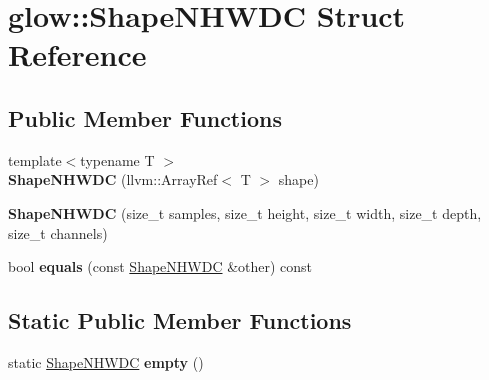 \hypertarget{structglow_1_1_shape_n_h_w_d_c}{}\section{glow\+:\+:Shape\+N\+H\+W\+DC Struct Reference}
\label{structglow_1_1_shape_n_h_w_d_c}
\subsection*{Public Member Functions}
\begin{DoxyCompactItemize}
\item 
\mbox{\label{structglow_1_1_shape_n_h_w_d_c_af9515d4a106192d580d0fdd5f69f41ea}} 
{\footnotesize template$<$typename T $>$ }\\{\bfseries Shape\+N\+H\+W\+DC} (llvm\+::\+Array\+Ref$<$ T $>$ shape)
\item 
\mbox{\label{structglow_1_1_shape_n_h_w_d_c_a2435671dbb64a66e6386a089600b525a}} 
{\bfseries Shape\+N\+H\+W\+DC} (size\+\_\+t samples, size\+\_\+t height, size\+\_\+t width, size\+\_\+t depth, size\+\_\+t channels)
\item 
\mbox{\label{structglow_1_1_shape_n_h_w_d_c_a7a64e2840303868dd9090a59a393679c}} 
bool {\bfseries equals} (const \hyperlink{structglow_1_1_shape_n_h_w_d_c}{Shape\+N\+H\+W\+DC} \&other) const
\end{DoxyCompactItemize}
\subsection*{Static Public Member Functions}
\begin{DoxyCompactItemize}
\item 
\mbox{\label{structglow_1_1_shape_n_h_w_d_c_ace756b610d5362d1433c0ba676cf33a7}} 
static \hyperlink{structglow_1_1_shape_n_h_w_d_c}{Shape\+N\+H\+W\+DC} {\bfseries empty} ()
\end{DoxyCompactItemize}
